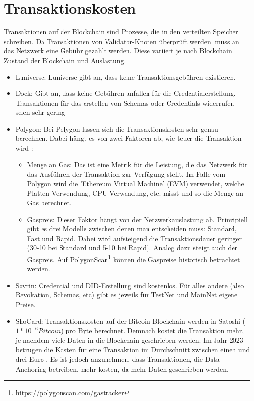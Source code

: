 \section{Transaktionskosten}
Transaktionen auf der Blockchain sind Prozesse, die in den verteilten Speicher schreiben. Da Transaktionen von Validator-Knoten überprüft werden, muss an das Netzwerk eine Gebühr gezahlt werden. Diese variiert je nach Blockchain, Zustand der Blockchain und Auslastung.
\begin{itemize}
	\item Luniverse: Luniverse gibt an, dass keine Transaktionsgebühren existieren.
	\item Dock: Gibt an, dass keine Gebühren anfallen für die Credentialerstellung. Transaktionen für das erstellen von Schemas oder Credentials widerrufen seien sehr gering \cite{ID44}
	\item Polygon: Bei Polygon lassen sich die Transaktionskosten sehr genau berechnen. Dabei hängt es von zwei Faktoren ab, wie teuer die Transaktion wird \cite{ID45}:
	\begin{itemize}
		\item Menge an Gas: Das ist eine Metrik für die Leistung, die das Netzwerk für das Ausführen der Transaktion zur Verfügung stellt. Im Falle vom Polygon wird die 'Ethereum Virtual Machine' (EVM) verwendet, welche Platten-Verwendung, CPU-Verwendung, etc. misst und so die Menge an Gas berechnet.
		\item Gaspreis: Dieser Faktor hängt von der Netzwerkauslastung ab. Prinzipiell gibt es drei Modelle zwischen denen man entscheiden muss: Standard, Fast und Rapid. Dabei wird aufsteigend die Transaktionsdauer geringer (30-10 bei Standard und 5-10 bei Rapid). Analog dazu steigt auch der Gaspreis. Auf PolygonScan\footnote{https://polygonscan.com/gastracker} können die Gaspreise historisch betrachtet werden.
	\end{itemize}
	\item Sovrin: Credential und DID-Erstellung sind kostenlos. Für alles andere (also Revokation, Schemas, etc) gibt es jeweils für TestNet und MainNet eigene Preise.
	\item ShoCard: Transaktionskosten auf der Bitcoin Blockchain werden in Satoshi ($1 * 10^{-6} Bitcoin$) pro Byte berechnet. Demnach kostet die Transaktion mehr, je nachdem viele Daten in die Blockchain geschrieben werden. Im Jahr 2023 betrugen die Kosten für eine Transaktion im Durchschnitt zwischen einen und drei Euro \cite{ID49}. Es ist jedoch anzunehmen, dass Transaktionen, die Data-Anchoring betreiben, mehr kosten, da mehr Daten geschrieben werden.
	
\end{itemize}

